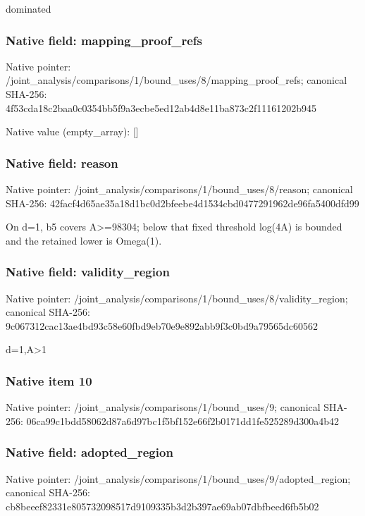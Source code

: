 \documentclass[10pt,a4paper]{article}
\begin{document}
\begingroup\raggedright\sloppy dominated\par\endgroup

\subsubsection{Native field: mapping\_\allowbreak{}proof\_\allowbreak{}refs}
Native pointer: /joint\_\allowbreak{}analysis/comparisons/1/bound\_\allowbreak{}uses/8/mapping\_\allowbreak{}proof\_\allowbreak{}refs; canonical SHA-256: 4f53cda18c2baa0c0354bb5f9a3ecbe5ed12ab4d8e11ba873c2f11161202b945

Native value (empty\_\allowbreak{}array): []

\subsubsection{Native field: reason}
Native pointer: /joint\_\allowbreak{}analysis/comparisons/1/bound\_\allowbreak{}uses/8/reason; canonical SHA-256: 42facf4d65ae35a18d1bc0d2bfeebe4d1534cbd0477291962de96fa5400dfd99

\begingroup\raggedright\sloppy On d=\allowbreak{}1,\allowbreak{} b5 covers A>=\allowbreak{}98304;\allowbreak{} below that fixed threshold log(4A) is bounded and the retained lower is Omega(1).\par\endgroup

\subsubsection{Native field: validity\_\allowbreak{}region}
Native pointer: /joint\_\allowbreak{}analysis/comparisons/1/bound\_\allowbreak{}uses/8/validity\_\allowbreak{}region; canonical SHA-256: 9c067312cac13ae4bd93c58e60fbd9eb70e9e892abb9f3c0bd9a79565dc60562

\begingroup\raggedright\sloppy d=\allowbreak{}1,\allowbreak{}A>1\par\endgroup

\subsubsection{Native item 10}
Native pointer: /joint\_\allowbreak{}analysis/comparisons/1/bound\_\allowbreak{}uses/9; canonical SHA-256: 06ca99c1bdd58062d87a6d97bc1f5bf152e66f2b0171dd1fe525289d300a4b42

\subsubsection{Native field: adopted\_\allowbreak{}region}
Native pointer: /joint\_\allowbreak{}analysis/comparisons/1/bound\_\allowbreak{}uses/9/adopted\_\allowbreak{}region; canonical SHA-256: cb8beeef82331e805732098517d9109335b3d2b397ae69ab07dbfbeed6fb5b02
\end{document}
